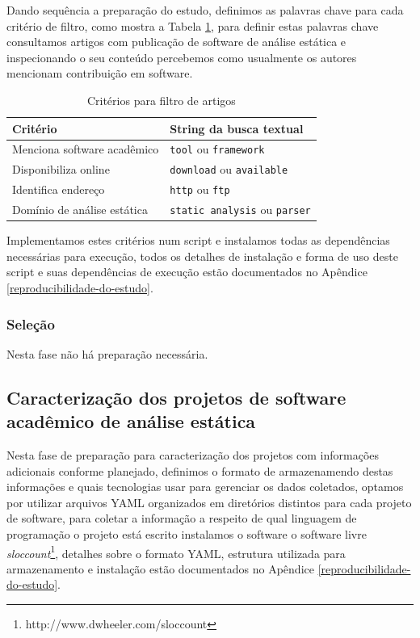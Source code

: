 Dando sequência a preparação do estudo, definimos as palavras chave para cada
critério de filtro, como mostra a Tabela \ref{criterios-filtro}, para definir
estas palavras chave consultamos artigos com publicação de software de análise
estática e inspecionando o seu conteúdo percebemos como usualmente os
autores mencionam contribuição em software.

\begin{table}[h]
\caption{Critérios para filtro de artigos}
\centering
\begin{tabular}{ l l }
  \hline
  Critério                        & String da busca textual               \\
  \hline
  Menciona software acadêmico     & {\tt tool} ou {\tt framework}         \\
  Disponibiliza online            & {\tt download} ou {\tt available}     \\
  Identifica endereço             & {\tt http} ou {\tt ftp}               \\
  Domínio de análise estática     & {\tt static analysis} ou {\tt parser} \\
  \hline
\end{tabular}
\label{criterios-filtro}
\end{table}

Implementamos estes critérios num script e instalamos todas as dependências
necessárias para execução, todos os detalhes de instalação e forma de uso deste
script e suas dependências de execução estão documentados no Apêndice
\ref{reproducibilidade-do-estudo}.

\subsubsection{Seleção}

Nesta fase não há preparação necessária.


\subsection{Caracterização dos projetos de software acadêmico de análise estática} %

Nesta fase de preparação para caracterização dos projetos com informações
adicionais conforme planejado, definimos o formato de armazenamendo destas
informações e quais tecnologias usar para gerenciar os dados coletados, optamos
por utilizar arquivos YAML organizados em diretórios distintos para cada
projeto de software, para coletar a informação a respeito de qual linguagem de
programação o projeto está escrito instalamos o software o software livre {\it
sloccount}\footnote{http://www.dwheeler.com/sloccount}, detalhes sobre o
formato YAML, estrutura utilizada para armazenamento e instalação estão
documentados no Apêndice \ref{reproducibilidade-do-estudo}.

